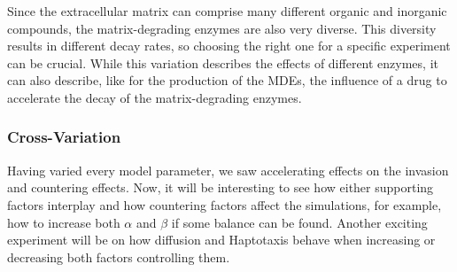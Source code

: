 Since the extracellular matrix can comprise many different organic and inorganic compounds, the matrix-degrading enzymes are also very diverse. This diversity results in different decay rates, so choosing the right one for a specific experiment can be crucial. While this variation describes the effects of different enzymes, it can also describe, like for the production of the MDEs, the influence of a drug to accelerate the decay of the matrix-degrading enzymes.

\subsubsection*{Cross-Variation}
Having varied every model parameter, we saw accelerating effects on the invasion and countering effects. Now, it will be interesting to see how either supporting factors interplay and how countering factors affect the simulations, for example, how to increase both $\alpha$ and $\beta$ if some balance can be found. Another exciting experiment will be on how diffusion and Haptotaxis behave when increasing or decreasing both factors controlling them.

